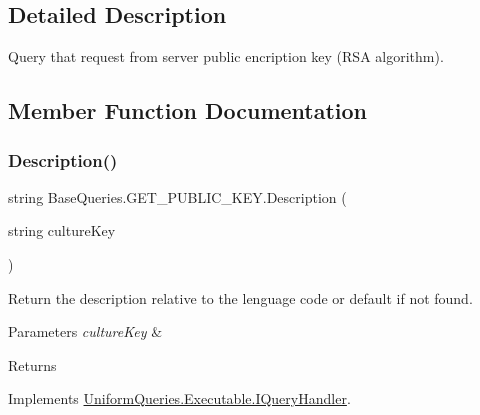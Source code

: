 \subsection{Detailed Description}
Query that request from server public encription key (R\+SA algorithm). 



\subsection{Member Function Documentation}
\mbox{\label{class_base_queries_1_1_g_e_t___p_u_b_l_i_c___k_e_y_afcd94e8596f6c015a1a60c987d53cfa8}} 
\subsubsection{\texorpdfstring{Description()}{Description()}}
{\footnotesize\ttfamily string Base\+Queries.\+G\+E\+T\+\_\+\+P\+U\+B\+L\+I\+C\+\_\+\+K\+E\+Y.\+Description (\begin{DoxyParamCaption}\item[{string}]{culture\+Key }\end{DoxyParamCaption})}



Return the description relative to the lenguage code or default if not found. 


\begin{DoxyParams}{Parameters}
{\em culture\+Key} & \\
\hline
\end{DoxyParams}
\begin{DoxyReturn}{Returns}

\end{DoxyReturn}


Implements \mbox{\hyperlink{interface_uniform_queries_1_1_executable_1_1_i_query_handler_ae0e55919571d5456af31298394d241a9}{Uniform\+Queries.\+Executable.\+I\+Query\+Handler}}.

\mbox{\label{class_base_queries_1_1_g_e_t___p_u_b_l_i_c___k_e_y_a6351a2ced538508e861a1829864d1d0d}} 
